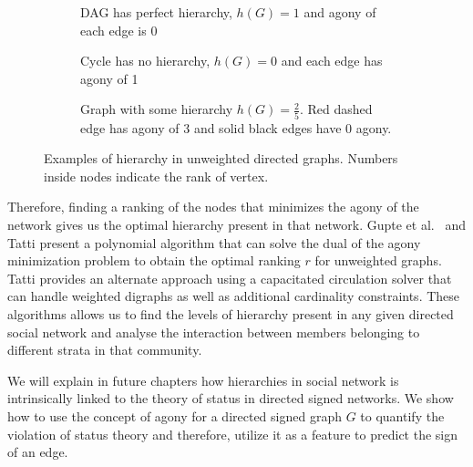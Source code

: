  
\begin{figure}[!ht]
    \centering
    \begin{subfigure}[t]{0.5\textwidth}
        \centering
        
        \caption{DAG has perfect hierarchy, $h(G)=1$ and agony of each edge is 0}
        \label{fig:dag}
    \end{subfigure}

    \begin{subfigure}[t]{0.49\textwidth}
        \centering
        
        \caption{Cycle has no hierarchy, $h(G)=0$ and each edge has agony of 1}
        \label{fig:cycle}
    \end{subfigure}
    \begin{subfigure}[t]{0.49\textwidth}
        \centering
        
        \caption{Graph with some hierarchy $h(G)=\frac{2}{5}$. Red dashed edge has agony of 3 and solid black edges have 0 agony.  }
        \label{fig:some-hierarchy}
    \end{subfigure}
    \caption{Examples of hierarchy in unweighted directed graphs. Numbers inside nodes indicate the rank of vertex.}
    \label{fig:hierarchy} 
\end{figure}

Therefore, finding a ranking of the nodes that minimizes the agony of the network gives us the optimal hierarchy present in that network.
Gupte et al.\ \cite{gupte2011finding} and Tatti \cite{tatti2014faster} present a polynomial algorithm that can solve the dual of the agony minimization problem to obtain the optimal ranking $r$ for unweighted graphs.
Tatti \cite{tatti2017tiers} provides an alternate approach using a capacitated circulation solver that can handle weighted digraphs as well as additional cardinality constraints.
These algorithms allows us to find the levels of hierarchy present in any given directed social network and analyse the interaction between members belonging to different strata in that community.

We will explain in future chapters how hierarchies in social network is intrinsically linked to the theory of status in directed signed networks.
We show how to use the concept of agony for a directed signed graph $G$ to quantify the violation of status theory and therefore, utilize it as a feature to predict the sign of an edge.




